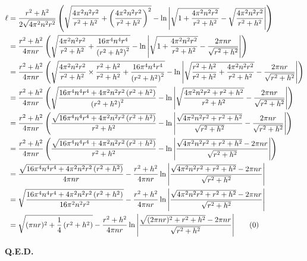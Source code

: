 \documentclass{article}
\begin{document}
\begin{align*}
    \ell &= \frac{r^2+h^2}{2\sqrt{4\pi^2n^2r^2}}\left(\sqrt{\frac{4\pi^2n^2r^2}{r^2+h^2}+\left(\frac{4\pi^2n^2r^2}{r^2+h^2}\right)^2}-\ln\Bigg|\sqrt{1+\frac{4\pi^2n^2r^2}{r^2+h^2}}-\sqrt{\frac{4\pi^2n^2r^2}{r^2+h^2}}\Bigg|\right)\\
    &= \frac{r^2+h^2}{4\pi nr}\left(\sqrt{\frac{4\pi^2n^2r^2}{r^2+h^2}+\frac{16\pi^4n^4r^4}{\left(r^2+h^2\right)^2}}-\ln\Bigg|\sqrt{1+\frac{4\pi^2n^2r^2}{r^2+h^2}}-\frac{2\pi nr}{\sqrt{r^2+h^2}}\Bigg|\right)\\
    &= \frac{r^2+h^2}{4\pi nr}\left(\sqrt{\frac{4\pi^2n^2r^2}{r^2+h^2}\times\frac{r^2+h^2}{r^2+h^2}+\frac{16\pi^4n^4r^4}{\left(r^2+h^2\right)^2}}-\ln\Bigg|\sqrt{\frac{r^2+h^2}{r^2+h^2}+\frac{4\pi^2n^2r^2}{r^2+h^2}}-\frac{2\pi nr}{\sqrt{r^2+h^2}}\Bigg|\right)\\
    &= \frac{r^2+h^2}{4\pi nr}\left(\sqrt{\frac{16\pi^4n^4r^4+4\pi^2n^2r^2\left(r^2+h^2\right)}{\left(r^2+h^2\right)^2}}-\ln\Bigg|\sqrt{\frac{4\pi^2n^2r^2+r^2+h^2}{r^2+h^2}}-\frac{2\pi nr}{\sqrt{r^2+h^2}}\Bigg|\right)\\
    &= \frac{r^2+h^2}{4\pi nr}\left(\frac{\sqrt{16\pi^4n^4r^4+4\pi^2n^2r^2\left(r^2+h^2\right)}}{r^2+h^2}-\ln\Bigg|\frac{\sqrt{4\pi^2n^2r^2+r^2+h^2}}{\sqrt{r^2+h^2}}-\frac{2\pi nr}{\sqrt{r^2+h^2}}\Bigg|\right)\\
    &= \frac{r^2+h^2}{4\pi nr}\left(\frac{\sqrt{16\pi^4n^4r^4+4\pi^2n^2r^2\left(r^2+h^2\right)}}{r^2+h^2}-\ln\Bigg|\frac{\sqrt{4\pi^2n^2r^2+r^2+h^2}-2\pi nr}{\sqrt{r^2+h^2}}\Bigg|\right)\\
    &= \frac{\sqrt{16\pi^4n^4r^4+4\pi^2n^2r^2\left(r^2+h^2\right)}}{4\pi nr}-\frac{r^2+h^2}{4\pi nr}\ln\Bigg|\frac{\sqrt{4\pi^2n^2r^2+r^2+h^2}-2\pi nr}{\sqrt{r^2+h^2}}\Bigg|\\
    &= \sqrt{\frac{16\pi^4n^4r^4+4\pi^2n^2r^2\left(r^2+h^2\right)}{16\pi^2 n^2r^2}}-\frac{r^2+h^2}{4\pi nr}\ln\Bigg|\frac{\sqrt{4\pi^2n^2r^2+r^2+h^2}-2\pi nr}{\sqrt{r^2+h^2}}\Bigg|\\
    &= \sqrt{(\pi nr)^2+\frac{1}{4}\left(r^2+h^2\right)}-\frac{r^2+h^2}{4\pi nr}\ln\Bigg|\frac{\sqrt{(2\pi nr)^2+r^2+h^2}-2\pi nr}{\sqrt{r^2+h^2}}\Bigg|\tag{\theequation}\label{eqn:fin1}
    \stepcounter{equation}
\end{align*}
\begin{flushright}
    \textbf{Q.E.D.}
\end{flushright}
\end{document}
